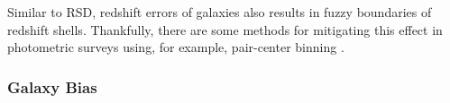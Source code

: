 \documentclass[iop]{emulateapj}
\begin{document}
Similar to RSD, redshift errors of galaxies
also results in fuzzy boundaries of redshift shells.
Thankfully, there are some methods for mitigating this effect in photometric surveys using, for example, pair-center binning \citep{2010MNRAS.407..520N, 2011MNRAS.415.2193R}. 

\subsubsection{Galaxy Bias}

\begin{figure}
\end{figure}
\end{document}
